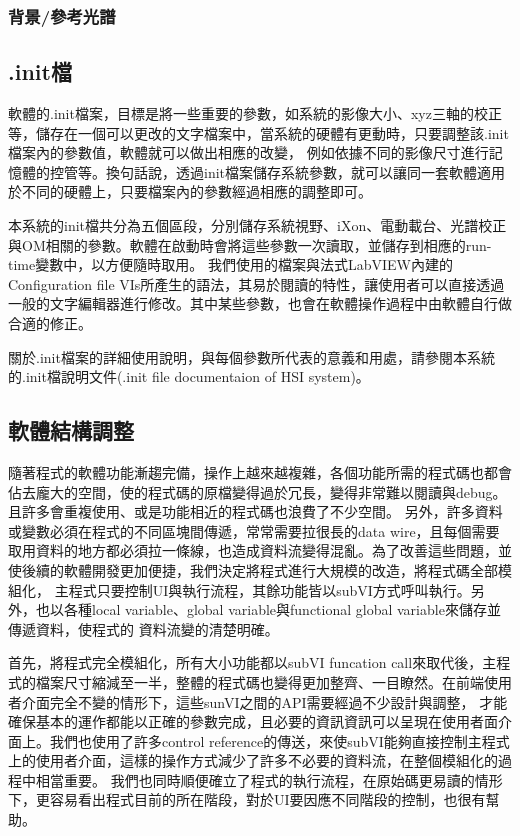 \documentclass[12pt]{article}
\begin{document}
    \subsubsection{背景/參考光譜}
    \subsection{.init檔}
    軟體的.init檔案，目標是將一些重要的參數，如系統的影像大小、xyz三軸的校正等，儲存在一個可以更改的文字檔案中，當系統的硬體有更動時，只要調整該.init檔案內的參數值，軟體就可以做出相應的改變，
    例如依據不同的影像尺寸進行記憶體的控管等。換句話說，透過init檔案儲存系統參數，就可以讓同一套軟體適用於不同的硬體上，只要檔案內的參數經過相應的調整即可。

    本系統的init檔共分為五個區段，分別儲存系統視野、iXon、電動載台、光譜校正與OM相關的參數。軟體在啟動時會將這些參數一次讀取，並儲存到相應的run-time變數中，以方便隨時取用。
    我們使用的檔案與法式LabVIEW內建的Configuration file VIs所產生的語法，其易於閱讀的特性，讓使用者可以直接透過一般的文字編輯器進行修改。其中某些參數，也會在軟體操作過程中由軟體自行做合適的修正。

    關於.init檔案的詳細使用說明，與每個參數所代表的意義和用處，請參閱本系統的.init檔說明文件(.init file documentaion of HSI system)。
    \subsection{軟體結構調整}
    隨著程式的軟體功能漸趨完備，操作上越來越複雜，各個功能所需的程式碼也都會佔去龐大的空間，使的程式碼的原檔變得過於冗長，變得非常難以閱讀與debug。且許多會重複使用、或是功能相近的程式碼也浪費了不少空間。
    另外，許多資料或變數必須在程式的不同區塊間傳遞，常常需要拉很長的data wire，且每個需要取用資料的地方都必須拉一條線，也造成資料流變得混亂。為了改善這些問題，並使後續的軟體開發更加便捷，我們決定將程式進行大規模的改造，將程式碼全部模組化，
    主程式只要控制UI與執行流程，其餘功能皆以subVI方式呼叫執行。另外，也以各種local variable、global variable與functional global variable來儲存並傳遞資料，使程式的
    資料流變的清楚明確。
    
    首先，將程式完全模組化，所有大小功能都以subVI funcation call來取代後，主程式的檔案尺寸縮減至一半，整體的程式碼也變得更加整齊、一目瞭然。在前端使用者介面完全不變的情形下，這些sunVI之間的API需要經過不少設計與調整，
    才能確保基本的運作都能以正確的參數完成，且必要的資訊資訊可以呈現在使用者面介面上。我們也使用了許多control reference的傳送，來使subVI能夠直接控制主程式上的使用者介面，這樣的操作方式減少了許多不必要的資料流，在整個模組化的過程中相當重要。
    我們也同時順便確立了程式的執行流程，在原始碼更易讀的情形下，更容易看出程式目前的所在階段，對於UI要因應不同階段的控制，也很有幫助。
\end{document}
